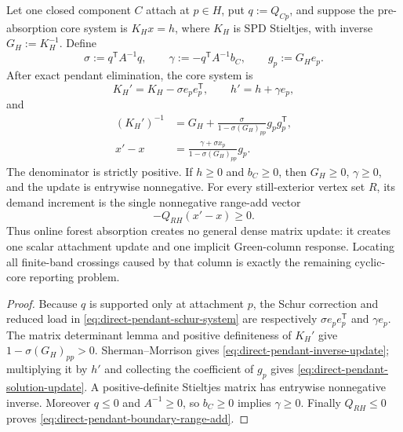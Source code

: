 \begin{proposition}
\label{prop:direct-pendant-rank-one-response}
Let one closed component $C$ attach at $p\in H$, put
$q:=Q_{Cp}$, and suppose the pre-absorption core system is
$K_Hx=h$, where $K_H$ is SPD Stieltjes, with inverse
$G_H:=K_H^{-1}$.  Define
\begin{equation}
 \sigma:=q^\mathsf TA^{-1}q,
 \qquad
 \gamma:=-q^\mathsf TA^{-1}b_C,
 \qquad
 g_p:=G_He_p.
 \label{eq:direct-pendant-rank-one-data}
\end{equation}
After exact pendant elimination, the core system is
\begin{equation*}
 K_H'=K_H-\sigma e_pe_p^\mathsf T,
 \qquad h'=h+\gamma e_p,
\end{equation*}
and
\begin{align}
 (K_H')^{-1}
 &=G_H+\frac{\sigma}{1-\sigma (G_H)_{pp}}g_pg_p^\mathsf T,
 \label{eq:direct-pendant-inverse-update}\\
 x'-x
 &=\frac{\gamma+\sigma x_p}{1-\sigma (G_H)_{pp}}g_p.
 \label{eq:direct-pendant-solution-update}
\end{align}
The denominator is strictly positive.  If $h\geq0$ and $b_C\geq0$, then
$G_H\geq0$, $\gamma\geq0$, and the update is entrywise nonnegative.  For every
still-exterior vertex set $R$, its demand increment is the single nonnegative
range-add vector
\begin{equation}
 -Q_{RH}(x'-x)\geq0.
 \label{eq:direct-pendant-boundary-range-add}
\end{equation}
Thus online forest absorption creates no general dense matrix update: it
creates one scalar attachment update and one implicit Green-column response.
Locating all finite-band crossings caused by that column is exactly the
remaining cyclic-core reporting problem.
\end{proposition}

\begin{proof}
Because $q$ is supported only at attachment $p$, the Schur correction and
reduced load in \cref{eq:direct-pendant-schur-system} are respectively
$\sigma e_pe_p^\mathsf T$ and $\gamma e_p$.  The matrix determinant lemma and
positive definiteness of $K_H'$ give
$1-\sigma (G_H)_{pp}>0$.  Sherman--Morrison gives
\cref{eq:direct-pendant-inverse-update}; multiplying it by $h'$ and collecting
the coefficient of $g_p$ gives
\cref{eq:direct-pendant-solution-update}.  A positive-definite Stieltjes
matrix has entrywise nonnegative inverse.  Moreover $q\leq0$ and
$A^{-1}\geq0$, so $b_C\geq0$ implies $\gamma\geq0$.  Finally
$Q_{RH}\leq0$ proves \cref{eq:direct-pendant-boundary-range-add}.
\end{proof}

